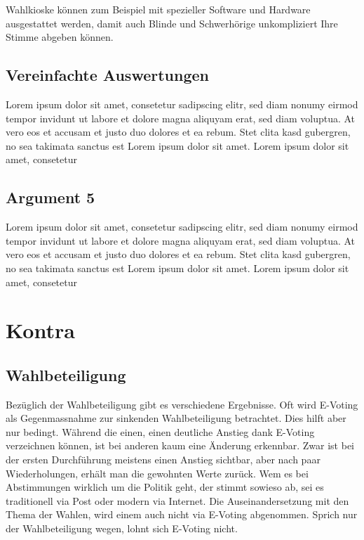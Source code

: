\documentclass[10pt,a4paper]{article} %
\begin{document}
\begin{multicols}{2}
Wahlkioske können zum Beispiel mit spezieller Software und Hardware ausgestattet werden, damit auch Blinde und Schwerhörige unkompliziert Ihre Stimme abgeben können.
  
\subsection*{Vereinfachte Auswertungen}
Lorem ipsum dolor sit amet, consetetur sadipscing elitr, sed diam nonumy eirmod tempor invidunt ut labore et dolore magna aliquyam erat, sed diam voluptua. At vero eos et accusam et justo duo dolores et ea rebum. Stet clita kasd gubergren, no sea takimata sanctus est Lorem ipsum dolor sit amet. Lorem ipsum dolor sit amet, consetetur 

\subsection*{Argument 5}
Lorem ipsum dolor sit amet, consetetur sadipscing elitr, sed diam nonumy eirmod tempor invidunt ut labore et dolore magna aliquyam erat, sed diam voluptua. At vero eos et accusam et justo duo dolores et ea rebum. Stet clita kasd gubergren, no sea takimata sanctus est Lorem ipsum dolor sit amet. Lorem ipsum dolor sit amet, consetetur 

\section*{Kontra}

\subsection*{Wahlbeteiligung}
Bezüglich der Wahlbeteiligung gibt es verschiedene Ergebnisse.
Oft wird E-Voting als Gegenmassnahme zur sinkenden Wahlbeteiligung betrachtet. Dies hilft aber nur bedingt.
Während die einen, einen deutliche Anstieg dank E-Voting verzeichnen können, ist bei anderen kaum eine Änderung erkennbar.
Zwar ist bei der ersten Durchführung meistens einen Anstieg sichtbar, aber nach paar Wiederholungen, erhält man die gewohnten Werte zurück.
Wem es bei Abstimmungen wirklich um die Politik geht, der stimmt sowieso ab, sei es traditionell via Post oder modern via Internet.
Die Auseinandersetzung mit den Thema der Wahlen, wird einem auch nicht via E-Voting abgenommen.
Sprich nur der Wahlbeteiligung wegen, lohnt sich E-Voting nicht.
 

\end{multicols}
\end{document}
